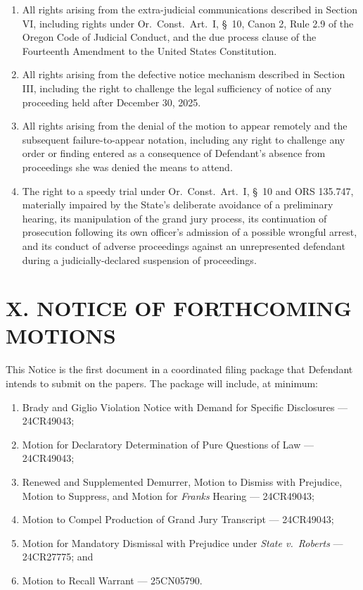 \documentclass[12pt,letterpaper]{article}
\begin{document}
\begin{enumerate}[leftmargin=*, label=\arabic*., itemsep=4pt]
\item All rights arising from the extra-judicial communications described in
Section VI, including rights under Or.\ Const.\ Art.\ I, \S~10, Canon 2,
Rule 2.9 of the Oregon Code of Judicial Conduct, and the due process clause
of the Fourteenth Amendment to the United States Constitution.

\item All rights arising from the defective notice mechanism described in
Section III, including the right to challenge the legal sufficiency of notice
of any proceeding held after December 30, 2025.

\item All rights arising from the denial of the motion to appear remotely and
the subsequent failure-to-appear notation, including any right to challenge
any order or finding entered as a consequence of Defendant's absence from
proceedings she was denied the means to attend.

\item The right to a speedy trial under Or.\ Const.\ Art.\ I, \S~10 and
ORS 135.747, materially impaired by the State's deliberate avoidance of a
preliminary hearing, its manipulation of the grand jury process, its
continuation of prosecution following its own officer's admission of a possible
wrongful arrest, and its conduct of adverse proceedings against an unrepresented
defendant during a judicially-declared suspension of proceedings.

\end{enumerate}


\section*{X. NOTICE OF FORTHCOMING MOTIONS}

This Notice is the first document in a coordinated filing package that Defendant
intends to submit on the papers. The package will include, at minimum:

\begin{enumerate}[leftmargin=*, label=(\arabic*), itemsep=2pt]
\item Brady and Giglio Violation Notice with Demand for Specific Disclosures
--- 24CR49043;
\item Motion for Declaratory Determination of Pure Questions of Law
--- 24CR49043;
\item Renewed and Supplemented Demurrer, Motion to Dismiss with Prejudice,
Motion to Suppress, and Motion for \textit{Franks} Hearing --- 24CR49043;
\item Motion to Compel Production of Grand Jury Transcript --- 24CR49043;
\item Motion for Mandatory Dismissal with Prejudice under \textit{State v.\
Roberts} --- 24CR27775; and
\item Motion to Recall Warrant --- 25CN05790.
\end{enumerate}
\end{document}
